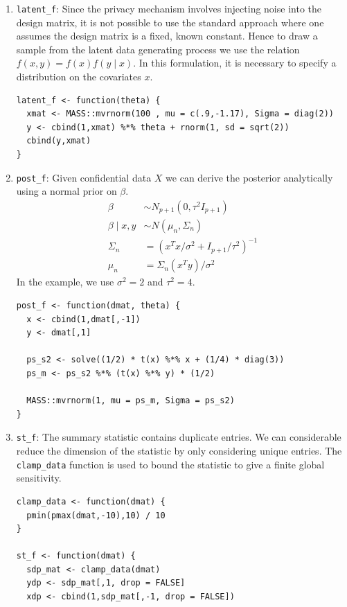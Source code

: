 \begin{enumerate}
\def\labelenumi{\arabic{enumi}.}
\item
  \texttt{latent\_f}: Since the privacy mechanism involves injecting noise into the design
  matrix, it is not possible to use the standard approach where one assumes the design
  matrix is a fixed, known constant. Hence to draw a sample from the latent data generating
  process we use the relation \(f(x,y) = f(x)f(y \mid x)\). In this formulation,
  it is necessary to specify a distribution on the covariates \(x\).

\begin{verbatim}
latent_f <- function(theta) {
  xmat <- MASS::mvrnorm(100 , mu = c(.9,-1.17), Sigma = diag(2))
  y <- cbind(1,xmat) %*% theta + rnorm(1, sd = sqrt(2))
  cbind(y,xmat)
}
\end{verbatim}
\item
  \texttt{post\_f}: Given confidential data \(X\) we can derive the posterior analytically
  using a normal prior on \(\beta\).
  \[
  \begin{aligned}
  \beta &\sim N_{p+1}(0, \tau^2 I_{p+1})\\
  \beta \mid x,y &\sim N(\mu_n, \Sigma_n)\\
  \Sigma_n &= (x^Tx/\sigma^2 + I_{p+1}/\tau^2)^{-1}\\
  \mu_n &= \Sigma_n(x^Ty)/\sigma^2
  \end{aligned}
  \]
  In the example, we use \(\sigma^2 = 2\) and \(\tau^2 = 4\).

\begin{verbatim}
post_f <- function(dmat, theta) {
  x <- cbind(1,dmat[,-1])
  y <- dmat[,1]

  ps_s2 <- solve((1/2) * t(x) %*% x + (1/4) * diag(3))
  ps_m <- ps_s2 %*% (t(x) %*% y) * (1/2)

  MASS::mvrnorm(1, mu = ps_m, Sigma = ps_s2)
}
\end{verbatim}
\item
  \texttt{st\_f}: The summary statistic contains duplicate
  entries. We can considerable reduce the dimension of the
  statistic by only considering unique entries. The \texttt{clamp\_data}
  function is used to bound the statistic to give a finite
  global sensitivity.

\begin{verbatim}
clamp_data <- function(dmat) {
  pmin(pmax(dmat,-10),10) / 10
}

st_f <- function(dmat) {
  sdp_mat <- clamp_data(dmat)
  ydp <- sdp_mat[,1, drop = FALSE]
  xdp <- cbind(1,sdp_mat[,-1, drop = FALSE])


\end{verbatim}
\end{enumerate}
